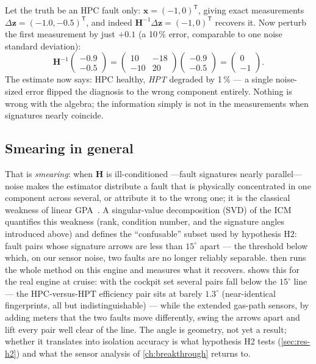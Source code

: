 Let the truth
be an HPC fault only: $\mathbf{x} = (-1, 0)^{\mathsf T}$, giving exact measurements
$\Delta\mathbf{z} = (-1.0, -0.5)^{\mathsf T}$, and indeed
$\mathbf{H}^{-1}\Delta\mathbf{z} = (-1, 0)^{\mathsf T}$ recovers it. Now perturb the first
measurement by just $+0.1$ (a 10\,\% error, comparable to one noise standard deviation):
\begin{equation*}
  \mathbf{H}^{-1}\begin{pmatrix}-0.9\\-0.5\end{pmatrix}
  = \begin{pmatrix} 10 & -18 \\ -10 & 20 \end{pmatrix}
    \begin{pmatrix}-0.9\\-0.5\end{pmatrix}
  = \begin{pmatrix} 0 \\ -1 \end{pmatrix}.
\end{equation*}
The estimate now says: HPC healthy, \emph{HPT} degraded by 1\,\% --- a single noise-sized error
flipped the diagnosis to the wrong component entirely. Nothing is wrong with the algebra; the
information simply is not in the measurements when signatures nearly coincide.

\subsection{Smearing in general}

That is \emph{smearing}: when $\mathbf{H}$ is ill-conditioned ---fault signatures nearly
parallel--- noise makes the estimator distribute a fault that is physically concentrated in one
component across several, or attribute it to the wrong one; it is the classical weakness of
linear GPA~\cite{Li2002}.
A singular-value decomposition (SVD) of the ICM quantifies this weakness (rank, condition
number, and the signature angles introduced above) and defines the ``confusable'' subset used
by hypothesis H2: fault pairs whose signature arrows are less than $15^{\circ}$ apart --- the
threshold below which, on our sensor noise, two faults are no longer reliably separable.
 then runs the whole method on this engine and measures what it recovers.
 shows this for the real engine at cruise: with the cockpit set
several pairs fall below the $15^{\circ}$ line --- the HPC-versus-HPT efficiency pair sits at
barely $1.3^{\circ}$ (near-identical fingerprints, all but indistinguishable) --- while the
extended gas-path sensors, by adding meters that the two faults move differently, swing the
arrows apart and lift every pair well clear of the line. The angle is geometry, not yet a result; whether it translates
into isolation accuracy is what hypothesis H2 tests (\cref{sec:res-h2}) and what the sensor
analysis of \cref{ch:breakthrough} returns to.

